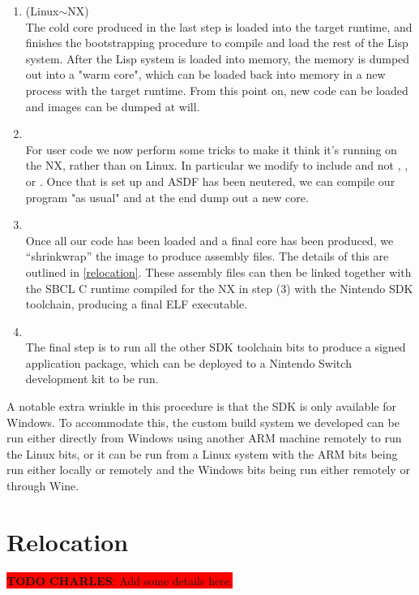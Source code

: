 \documentclass[format=sigconf]{acmart}
\begin{document}
\begin{enumerate}
\item {} (Linux$\sim$NX) \\
  The cold core produced in the last step is loaded into the target runtime, and finishes the bootstrapping procedure to compile and load the rest of the Lisp system. After the Lisp system is loaded into memory, the memory is dumped out into a "warm core", which can be loaded back into memory in a new process with the target runtime. From this point on, new code can be loaded and images can be dumped at will.
\item {} \\
  For user code we now perform some tricks to make it think it's running on the NX, rather than on Linux. In particular we modify  to include  and not , , or . Once that is set up and ASDF has been neutered, we can compile our program "as usual" and at the end dump out a new core.
\item {} \\
  Once all our code has been loaded and a final core has been produced, we ``shrinkwrap'' the image to produce assembly files. The details of this are outlined in \autoref{relocation}. These assembly files can then be linked together with the SBCL C runtime compiled for the NX in step (3) with the Nintendo SDK toolchain, producing a final ELF executable.
\item {} \\
  The final step is to run all the other SDK toolchain bits to produce a signed application package, which can be deployed to a Nintendo Switch development kit to be run.
\end{enumerate}

A notable extra wrinkle in this procedure is that the SDK is only available for Windows. To accommodate this, the custom build system we developed can be run either directly from Windows using another ARM machine remotely to run the Linux bits, or it can be run from a Linux system with the ARM bits being run either locally or remotely and the Windows bits being run either remotely or through Wine\cite{amstadt1994wine}.

\section{Relocation}\label{relocation}

\colorbox{red}{
  \textbf{TODO CHARLES}: Add some details here.
}
\end{document}
